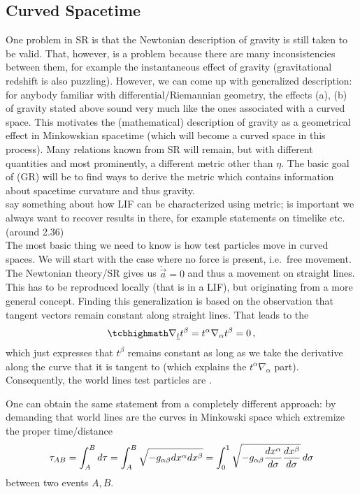 	\subsection{Curved Spacetime}
One problem in SR is that the Newtonian description of gravity is still taken to be valid. That, however, is a problem because there are many inconsistencies between them, for example the instantaneous effect of gravity (gravitational redshift is also puzzling). However, we can come up with generalized description: for anybody familiar with differential/Riemannian geometry, the effects (a), (b) of gravity stated above sound very much like the ones associated with a curved space. This motivates the (mathematical) description of gravity as a geometrical effect in Minkowskian spacetime (which will become a curved space in this process). Many relations known from SR will remain, but with different quantities and most prominently, a different metric other than $\eta$. The basic goal of  (GR) will be to find ways to derive the metric which contains information about spacetime curvature and thus gravity.\\


say something about how LIF can be characterized using metric; is important we always want to recover results in there, for example statements on timelike etc. (around 2.36)\\


The most basic thing we need to know is how test particles move in curved spaces. We will start with the case where no force is present, i.e.~free movement. The Newtonian theory/SR gives us $\ddot{\vec{a}} = 0$ and thus a movement on straight lines. This has to be reproduced locally (that is in a LIF), but originating from a more general concept. Finding this generalization is based on the observation that tangent vectors remain constant along straight lines. That leads to the 
\begin{equation}
\eqbox{
\nabla_{\underline{t}} t^\beta = t^\alpha \nabla_\alpha t^\beta = 0
}\, ,
\end{equation}
which just expresses that $t^\beta$ remains constant as long as we take the derivative along the curve that it is tangent to (which explains the $t^\alpha \nabla_\alpha$ part). Consequently, the world lines test particles are .

One can obtain the same statement from a completely different approach: by demanding that world lines are the curves in Minkowski space which extremize the proper time/distance
\begin{equation}
\tau_{AB} = \int_A^B d\tau = \int_A^B \sqrt{- g_{\alpha \beta} dx^\alpha dx^\beta} = \int_0^1 \sqrt{- g_{\alpha \beta} \dv{x^\alpha}{\sigma} \dv{x^\beta}{\sigma}} \, d\sigma
\end{equation}
between two events $A, B$.

